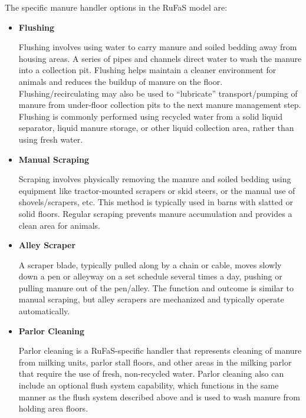 \begin{refsection}
    The specific manure handler options in the RuFaS model are:
    \begin{itemize}
        \item \textbf{Flushing} 
        \vspace{0.15cm}

        Flushing involves using water to carry manure and soiled bedding away from housing areas. A series of pipes and channels direct water to wash the manure into a collection pit. Flushing helps maintain a cleaner environment for animals and reduces the buildup of manure on the floor. Flushing/recirculating may also be used to “lubricate” transport/pumping of manure from under-floor collection pits to the next manure management step. Flushing is commonly performed using recycled water from a solid liquid separator, liquid manure storage, or other liquid collection area, rather than using fresh water.

        \item \textbf{Manual Scraping} 
        \vspace{0.15cm}

        Scraping involves physically removing the manure and soiled bedding using equipment like tractor-mounted scrapers or skid steers, or the manual use of shovels/scrapers, etc. This method is typically used in barns with slatted or solid floors. Regular scraping prevents manure accumulation and provides a clean area for animals.

        \item \textbf{Alley Scraper} 
        \vspace{0.15cm}

        A scraper blade, typically pulled along by a chain or cable, moves slowly down a pen or alleyway on a set schedule several times a day, pushing or pulling manure out of the pen/alley. The function and outcome is similar to manual scraping, but alley scrapers are mechanized and typically operate automatically.

        \item \textbf{Parlor Cleaning} 
        \vspace{0.15cm}

        Parlor cleaning is a RuFaS-specific handler that represents cleaning of manure from milking units, parlor stall floors, and other areas in the milking parlor that require the use of fresh, non-recycled water. Parlor cleaning also can include an optional flush system capability, which functions in the same manner as the flush system described above and is used to wash manure from holding area floors.
        

\end{itemize}
\end{refsection}
